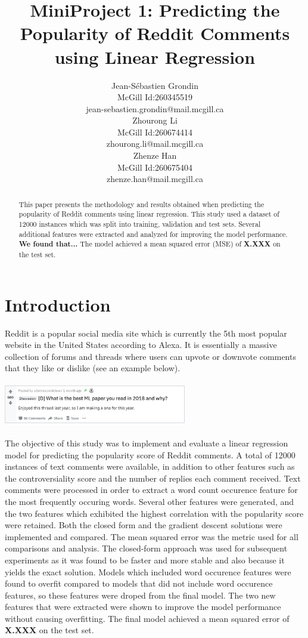 \documentclass[11pt]{article}
\title{MiniProject 1: Predicting the Popularity of Reddit Comments using Linear Regression}
\author{%
\begin{tabular}{c} Jean-Sébastien Grondin \\ \normalfont McGill Id:260345519  \\ \normalfont \small jean-sebastien.grondin@mail.mcgill.ca \end{tabular} 
\begin{tabular}{c} Zhourong Li \\ \normalfont McGill Id:260674414  \\ \normalfont \small zhourong.li@mail.mcgill.ca \end{tabular} 
\begin{tabular}{c} Zhenze Han \\ \normalfont McGill Id:260675404  \\ \normalfont \small zhenze.han@mail.mcgill.ca \end{tabular} }
\begin{document}
\maketitle

\begin{abstract}
This paper presents the methodology and results obtained when predicting the popularity of Reddit comments using linear regression. This study used a dataset of 12000 instances which was split into training, validation and test sets.  Several additional features were extracted and analyzed for improving the model performance. \textbf{We found that...} The model achieved a mean squared error (MSE) of  \textbf{X.XXX} on the test set. 
\end{abstract}

\section{Introduction}
Reddit is a popular social media site which is currently the 5th most popular website in the United States according to Alexa. It is essentially a massive collection of forums and threads where users can upvote or downvote comments that they like or dislike (see an example below).\\
\\
\includegraphics[width=8cm]{reddit}\\
\\
The objective of this study was to implement and evaluate a linear regression model for predicting the popularity score of Reddit comments. A total of 12000 instances of text comments were available, in addition to other features such as the controversiality score and the number of replies each comment received. Text comments were processed in order to extract a word count occurence feature for the most frequently occuring words. Several other features were generated, and the two features which exhibited the highest correlation with the popularity score were retained. Both the closed form and the gradient descent solutions were implemented and compared. The mean squared error was the metric used for all comparisons and analysis. The closed-form approach was used for subsequent experiments as it was found to be faster and more stable and also because it yields the exact solution. Models which included word occurence features were found to overfit compared to models that did not include word occurence features, so these features were droped from the final model. The two new features that were extracted were shown to improve the model performance without causing overfitting. The final model achieved a mean squared error of \textbf{X.XXX} on the test set. 
\end{document}
